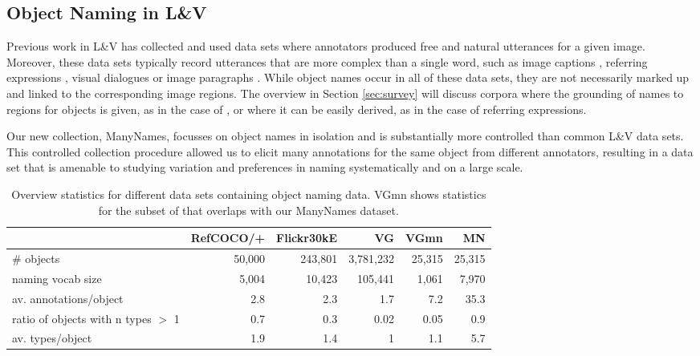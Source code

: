 \subsection{Object Naming in L\&V} 

Previous work in L\&V has collected and used data sets where annotators produced free and natural utterances for a given image. 
Moreover, these data sets typically record utterances that are more complex than a single word, such as image captions \cite{fangetal:2015,devlin:imcaqui,Bernardietal:automatic}, referring expressions \cite{Kazemzadeh2014,mao15,Yu2016}, visual dialogues \cite{das2017visual,vries2017guesswhat} or image paragraphs \cite{krause2017hierarchical}. While object names occur in all of these data sets, they are not necessarily marked up and linked to the corresponding image regions. The overview in Section \ref{sec:survey} will discuss corpora where the grounding of names to regions for objects is given, as in the case of \vgenome \cite{krishna2016visualgenome}, or where it can be easily derived, as in the case of referring expressions.

Our new collection, ManyNames, focusses on object names in isolation and is substantially more controlled than common L\&V data sets. This controlled collection procedure allowed us to elicit many annotations for the same object from different annotators, resulting in a data set that is amenable to studying variation and preferences in naming systematically and on a large scale.

\begin{table*}[htb]
  \centering
  \begin{tabular}{lrrrrr}
    \toprule
    &   RefCOCO/+  &  Flickr30kE &           VG &      VGmn &        MN \\
    \midrule
    \# objects & 50,000 & 243,801 & 3,781,232 & 25,315 & 25,315 \\
    naming vocab size &  5,004 &  10,423 &   105,441 &  1,061 &  7,970 \\
    av. annotations/object &      2.8 &       2.3 &         1.7 &      7.2 &     35.3 \\
    ratio of objects with n types $>$ 1 &      0.7 &       0.3 &         0.02 &      0.05 &      0.9 \\
    av. types/object &      1.9 &       1.4 &         1 &      1.1 &      5.7 \\
    \bottomrule
  \end{tabular}
  \caption{Overview statistics for different data sets containing object naming data. VGmn shows statistics for the subset of \vg that overlaps with our ManyNames dataset.\label{tab:compare}}
\end{table*}


